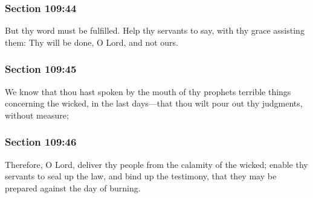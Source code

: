 	\subsubsection{Section 109:44} %
		\label{DC109-44}

		But thy word must be fulfilled.  Help thy servants to say, with thy grace assisting them: Thy will be done, O Lord, and not ours.


	\subsubsection{Section 109:45} %
		\label{DC109-45}

		We know that thou hast spoken by the mouth of thy prophets terrible things concerning the wicked, in the last days---that thou wilt pour out thy judgments, without measure;


	\subsubsection{Section 109:46} %
		\label{DC109-46}

		Therefore, O Lord, deliver thy people from the calamity of the wicked; enable thy servants to seal up the law, and bind up the testimony, that they may be prepared against the day of burning.


